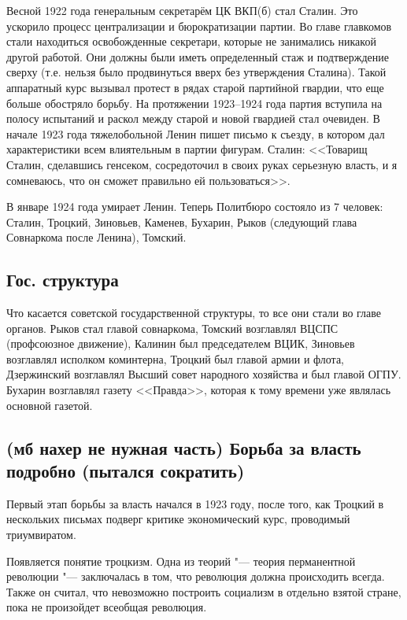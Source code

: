 Весной 1922 года генеральным секретарём ЦК ВКП(б) стал Сталин. Это ускорило процесс централизации и бюрократизации партии. Во главе главкомов стали находиться освобожденные секретари, которые не занимались никакой другой работой. Они должны были иметь определенный стаж и подтверждение сверху (т.е. нельзя было продвинуться вверх без утверждения Сталина). Такой аппаратный курс вызывал протест в рядах старой партийной гвардии, что еще больше обостряло борьбу. На протяжении 1923--1924 года партия вступила на полосу испытаний и раскол между старой и новой гвардией стал очевиден. В начале 1923 года тяжелобольной Ленин пишет письмо к съезду, в котором дал характеристики всем влиятельным в партии фигурам. Сталин: <<Товарищ Сталин, сделавшись генсеком, сосредоточил в своих руках серьезную власть, и я сомневаюсь, что он сможет правильно ей пользоваться>>.

В январе 1924 года умирает Ленин. Теперь Политбюро состояло из 7 человек: Сталин, Троцкий, Зиновьев, Каменев, Бухарин, Рыков (следующий глава Совнаркома после Ленина), Томский. 

\subsection{Гос. структура}

Что касается советской государственной структуры, то все они стали во главе органов. Рыков стал главой совнаркома, Томский возглавлял ВЦСПС (профсоюзное движение), Калинин был председателем ВЦИК, Зиновьев возглавлял исполком коминтерна, Троцкий был главой армии и флота, Дзержинский возглавлял Высший совет народного хозяйства и был главой ОГПУ. Бухарин возглавлял газету <<Правда>>, которая к тому времени уже являлась основной газетой.

\subsection{(мб нахер не нужная часть) Борьба за власть подробно (пытался сократить)}

Первый этап борьбы за власть начался в 1923 году, после того, как Троцкий в нескольких письмах подверг критике экономический курс, проводимый триумвиратом.

Появляется понятие троцкизм. Одна из теорий "--- теория перманентной революции "--- заключалась в том, что революция должна происходить всегда. Также он считал, что невозможно построить социализм в отдельно взятой стране, пока не произойдет всеобщая революция. 

